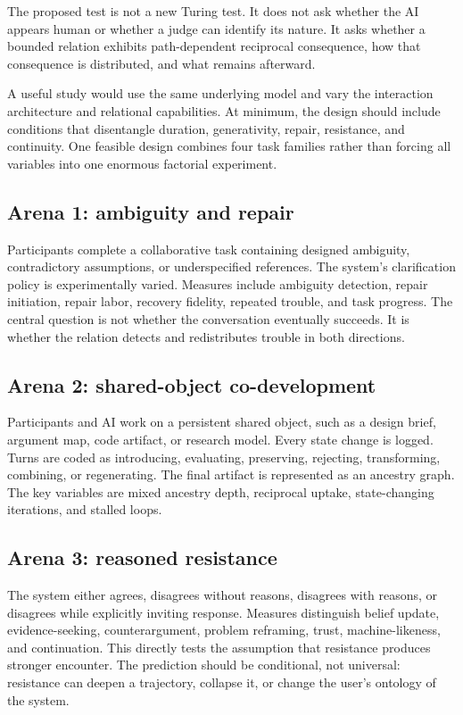 \documentclass[11pt]{article}
\begin{document}
The proposed test is not a new Turing test. It does not ask whether the AI appears human or whether a judge can identify its nature. It asks whether a bounded relation exhibits path-dependent reciprocal consequence, how that consequence is distributed, and what remains afterward.

A useful study would use the same underlying model and vary the interaction architecture and relational capabilities. At minimum, the design should include conditions that disentangle duration, generativity, repair, resistance, and continuity. One feasible design combines four task families rather than forcing all variables into one enormous factorial experiment.

\subsection{Arena 1: ambiguity and repair}

Participants complete a collaborative task containing designed ambiguity, contradictory assumptions, or underspecified references. The system's clarification policy is experimentally varied. Measures include ambiguity detection, repair initiation, repair labor, recovery fidelity, repeated trouble, and task progress. The central question is not whether the conversation eventually succeeds. It is whether the relation detects and redistributes trouble in both directions.

\subsection{Arena 2: shared-object co-development}

Participants and AI work on a persistent shared object, such as a design brief, argument map, code artifact, or research model. Every state change is logged. Turns are coded as introducing, evaluating, preserving, rejecting, transforming, combining, or regenerating. The final artifact is represented as an ancestry graph. The key variables are mixed ancestry depth, reciprocal uptake, state-changing iterations, and stalled loops.

\subsection{Arena 3: reasoned resistance}

The system either agrees, disagrees without reasons, disagrees with reasons, or disagrees while explicitly inviting response. Measures distinguish belief update, evidence-seeking, counterargument, problem reframing, trust, machine-likeness, and continuation. This directly tests the assumption that resistance produces stronger encounter. The prediction should be conditional, not universal: resistance can deepen a trajectory, collapse it, or change the user's ontology of the system.
\end{document}
